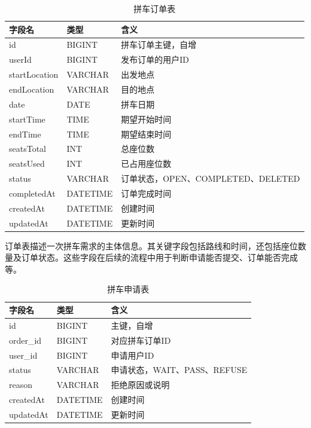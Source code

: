 \begin{table}[!htbp]
  \caption{拼车订单表}
  \label{tab:carpool-order-table}
  \centering
  \small
  \begin{tabular}{p{3.0cm}p{2.3cm}p{7.0cm}}
    \toprule
    字段名 & 类型 & 含义 \\
    \midrule
    id & BIGINT & 拼车订单主键，自增 \\
    userId & BIGINT & 发布订单的用户ID \\
    startLocation & VARCHAR & 出发地点 \\
    endLocation & VARCHAR & 目的地点 \\
    date & DATE & 拼车日期 \\
    startTime & TIME & 期望开始时间 \\
    endTime & TIME & 期望结束时间 \\
    seatsTotal & INT & 总座位数 \\
    seatsUsed & INT & 已占用座位数 \\
    status & VARCHAR & 订单状态，OPEN、COMPLETED、DELETED \\
    completedAt & DATETIME & 订单完成时间 \\
    createdAt & DATETIME & 创建时间 \\
    updatedAt & DATETIME & 更新时间 \\
    \bottomrule
  \end{tabular}
\end{table}

订单表描述一次拼车需求的主体信息。其关键字段包括路线和时间，还包括座位数量及订单状态。这些字段在后续的流程中用于判断申请能否提交、订单能否完成等。

\begin{table}[!htbp]
  \caption{拼车申请表}
  \label{tab:carpool-application-table}
  \centering
  \small
  \begin{tabular}{p{3.0cm}p{2.3cm}p{7.0cm}}
    \toprule
    字段名 & 类型 & 含义 \\
    \midrule
    id & BIGINT & 主键，自增 \\
    order\_id & BIGINT & 对应拼车订单ID \\
    user\_id & BIGINT & 申请用户ID \\
    status & VARCHAR & 申请状态，WAIT、PASS、REFUSE \\
    reason & VARCHAR & 拒绝原因或说明 \\
    createdAt & DATETIME & 创建时间 \\
    updatedAt & DATETIME & 更新时间 \\
    \bottomrule
  \end{tabular}
\end{table}

